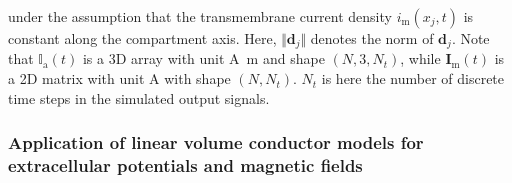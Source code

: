 under the assumption that the transmembrane current density $i_\mathrm{m}(x_j, t)$ is constant along the compartment axis.
Here, $\Vert\mathbf{d}_j \Vert$ denotes the norm of $\mathbf{d}_j$.
Note that $\mathbb{I}_\mathrm{a}(t)$ is a 3D array with unit \si{\ampere \metre} and shape $(N, 3, N_t)$,
while $\mathbf{I}_\mathrm{m}(t)$ is a 2D matrix with unit \si{A} with shape $(N, N_t)$.
$N_t$ is here the number of discrete time steps in the simulated output signals.



\subsubsection{Application of linear volume conductor models for extracellular potentials and magnetic fields}

